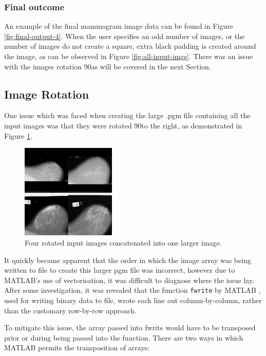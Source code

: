 \subsubsection{Final outcome}

An example of the final mammogram image data can be found in Figure \ref{fig:final-output-4}. When the user specifies an odd number of images, or the number of images do not create a square, extra black padding is created around the image, as can be observed in Figure \ref{fig:all-input-imgs}. There was an issue with the images rotation 90\degree as will be covered in the next Section.


\subsection{Image Rotation}
\label{ssec:trans}

One issue which was faced when creating the large .pgm file containing all the input images was that they were rotated 90\degree to the right, as demonstrated in Figure \ref{fig:rotated-input}.

\begin{figure}[H]
  \centering
  \includegraphics[width=0.4\textwidth]{Chapter2/technical-img/rotation.png}
  \caption{Four rotated input images concatenated into one larger image.}
  \label{fig:rotated-input}
\end{figure}

It quickly became apparent that the order in which the image array was being written to file to create this larger pgm file was incorrect, however due to MATLAB's use of vectorisation, it was difficult to diagnose where the issue lay. After some investigation, it was revealed that the function \texttt{fwrite} by MATLAB \cite{fwrite}, used for writing binary data to file, wrote each line out column-by-column, rather than the customary row-by-row approach.

To mitigate this issue, the array passed into fwrite would have to be transposed prior or during being passed into the function. There are two ways in which MATLAB permits the \gls{transposition} of arrays:

